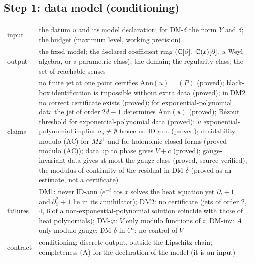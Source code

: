 \subsection*{Step 1: data model (conditioning)}
\begin{tabular}{@{}p{2.2cm}p{9.6cm}@{}}
\toprule
input & the datum $u$ and its model declaration; for DM-$\delta$ the norm $Y$ and $\delta$; the budget (maximum level, working precision)\\
output & the fixed model; the declared coefficient ring ($\mathbb{C}[\partial]$, $\mathbb{C}(x)[\partial]$, a Weyl algebra, or a parametric class); the domain; the regularity class; the set of reachable senses\\
claims & no finite jet at one point certifies $\mathrm{Ann}(u)=(P)$ (proved); black-box identification is impossible without extra data (proved); in DM2 no correct certificate exists (proved); for exponential-polynomial data the jet of order $2d-1$ determines $\mathrm{Ann}(u)$ (proved); Bézout threshold for exponential-polynomial data (proved); $u$ exponential-polynomial implies $\sigma_p\ne\emptyset$ hence no ID-ann (proved); decidability modulo (AC) for $M2^+$ and for holonomic closed forms (proved modulo (AC)); data up to phase gives $V+c$ (proved); gauge-invariant data gives at most the gauge class (proved, source verified); the modulus of continuity of the residual in DM-$\delta$ (proved as an estimate, not a certificate)\\
failures & DM1: never ID-ann ($e^{-t}\cos x$ solves the heat equation yet $\partial_t+1$ and $\partial_x^2+1$ lie in its annihilator); DM2: no certificate (jets of order 2, 4, 6 of a non-exponential-polynomial solution coincide with those of heat polynomials); DM-$\varphi$: $V$ only modulo functions of $t$; DM-inv: $A$ only modulo gauge; DM-$\delta$ in $C^1$: no control of $V$\\
contract & conditioning: discrete output, outside the Lipschitz chain; completeness (A) for the declaration of the model (it is an input)\\
\bottomrule
\end{tabular}

